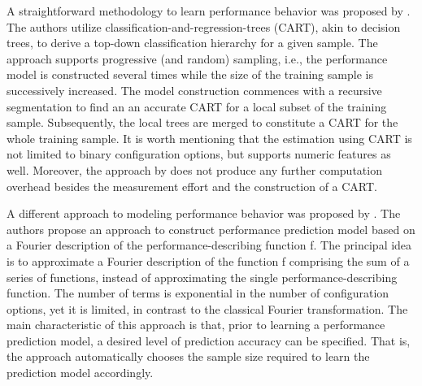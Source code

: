 A straightforward
methodology to learn performance behavior was proposed by \cite{guo_variability-aware_2013}. The
authors utilize classification-and-regression-trees (CART), akin to decision
trees, to derive a top-down classification hierarchy for a given sample. The
approach supports progressive (and random) sampling, i.e., the performance
model is constructed several times while the size of the training sample is
successively increased. The model construction commences with a recursive
segmentation to find an an accurate CART for a local subset of the training
sample. Subsequently, the local trees are merged to constitute a CART for the
whole training sample. It is worth mentioning that the estimation using CART is
not limited to binary configuration options, but supports numeric features as
well. Moreover, the approach by \cite{guo_variability-aware_2013} does not produce any further
computation overhead besides the measurement effort and the construction of a
CART.

A different approach to modeling performance behavior was
proposed by \cite{zhang_performance_2015}. The authors propose an approach to construct
performance prediction model based on a Fourier description of the
performance-describing function f. The principal idea is to approximate a
Fourier description of the function f comprising the sum of a series of
functions, instead of approximating the single performance-describing function.
The number of terms is exponential in the number of configuration options, yet
it is limited, in contrast to the classical Fourier transformation. The main
characteristic of this approach is that, prior to learning a performance
prediction model, a desired level of prediction accuracy can be specified. That
is, the approach automatically chooses the sample size required to learn the
prediction model accordingly.

